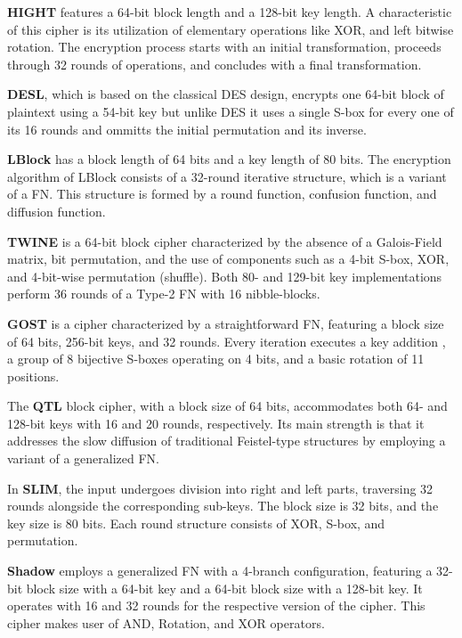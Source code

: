 \documentclass[conference,compsoc]{IEEEtran}
\begin{document}
\textbf{HIGHT} features a 64-bit block length and a 128-bit key length. A characteristic of this cipher is its utilization of elementary operations like XOR, and left bitwise rotation. The encryption process starts with an initial transformation, proceeds through 32 rounds of operations, and concludes with a final transformation.

\textbf{DESL}, which is based on the classical DES design, encrypts one 64-bit block of plaintext using a 54-bit key but unlike DES it uses a single S-box for every one of its 16 rounds and ommitts the initial permutation and its inverse.

\textbf{LBlock} has a block length of 64 bits and a key length of 80 bits. The encryption algorithm of LBlock consists of a 32-round iterative structure, which is a variant of a FN. This structure is formed by a round function, confusion function, and diffusion function.

\textbf{TWINE} is a 64-bit block cipher characterized by the absence of a Galois-Field matrix, bit permutation, and the use of components such as a 4-bit S-box, XOR, and 4-bit-wise permutation (shuffle). Both 80- and 129-bit key implementations perform 36 rounds of a Type-2 FN with 16 nibble-blocks.

\textbf{GOST} is a cipher characterized by a straightforward FN, featuring a block size of 64 bits, 256-bit keys, and 32 rounds. Every iteration executes a key addition , a group of 8 bijective S-boxes operating on 4 bits, and a basic rotation of 11 positions. 

The \textbf{QTL} block cipher, with a block size of 64 bits, accommodates both 64- and 128-bit keys with 16 and 20 rounds, respectively. Its main strength is that it addresses the slow diffusion of traditional Feistel-type structures by employing a variant of a generalized FN.

In \textbf{SLIM}, the input undergoes division into right and left parts, traversing 32 rounds alongside the corresponding sub-keys. The block size is 32 bits, and the key size is 80 bits. Each round structure consists of XOR, S-box, and permutation.

\textbf{Shadow} employs a generalized FN with a 4-branch configuration, featuring a 32-bit block size with a 64-bit key and a 64-bit block size with a 128-bit key. It operates with 16 and 32 rounds for the respective version of the cipher. This cipher makes user of AND, Rotation, and XOR operators.

 
\end{document}
